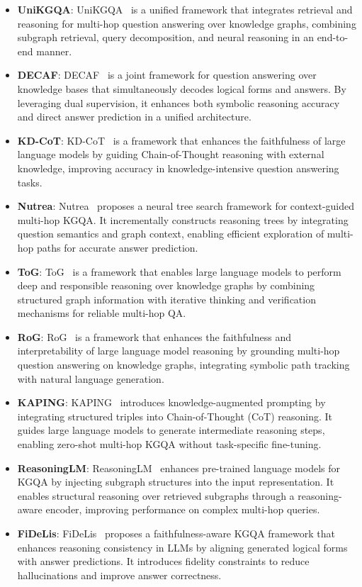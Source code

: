 \begin{itemize}
\begin{itemize}
    \item  \textbf{UniKGQA}: UniKGQA~\cite{jiang2022unikgqa} is a unified framework that integrates retrieval and reasoning for multi-hop question answering over knowledge graphs, combining subgraph retrieval, query decomposition, and neural reasoning in an end-to-end manner.
    \item \textbf{DECAF}: DECAF~\cite{yu2022decaf} is a joint framework for question answering over knowledge bases that simultaneously decodes logical forms and answers. By leveraging dual supervision, it enhances both symbolic reasoning accuracy and direct answer prediction in a unified architecture.
    \item \textbf{KD-CoT}: KD-CoT~\cite{wang2023knowledge} is a framework that enhances the faithfulness of large language models by guiding Chain-of-Thought reasoning with external knowledge, improving accuracy in knowledge-intensive question answering tasks.
    \item \textbf{Nutrea}: Nutrea~\cite{choi2023nutrea} proposes a neural tree search framework for context-guided multi-hop KGQA. It incrementally constructs reasoning trees by integrating question semantics and graph context, enabling efficient exploration of multi-hop paths for accurate answer prediction.
    \item \textbf{ToG}: ToG~\cite{sun2023think} is a framework that enables large language models to perform deep and responsible reasoning over knowledge graphs by combining structured graph information with iterative thinking and verification mechanisms for reliable multi-hop QA.
    \item \textbf{RoG}: RoG~\cite{luo2023reasoning} is a framework that enhances the faithfulness and interpretability of large language model reasoning by grounding multi-hop question answering on knowledge graphs, integrating symbolic path tracking with natural language generation.
    \item \textbf{KAPING}: KAPING~\cite{baek2023knowledge} introduces knowledge-augmented prompting by integrating structured triples into Chain-of-Thought (CoT) reasoning. It guides large language models to generate intermediate reasoning steps, enabling zero-shot multi-hop KGQA without task-specific fine-tuning.
    \item \textbf{ReasoningLM}: ReasoningLM~\cite{jiang2023reasoninglm} enhances pre-trained language models for KGQA by injecting subgraph structures into the input representation. It enables structural reasoning over retrieved subgraphs through a reasoning-aware encoder, improving performance on complex multi-hop queries.
    \item \textbf{FiDeLis}: FiDeLis~\cite{sui2024fidelis} proposes a faithfulness-aware KGQA framework that enhances reasoning consistency in LLMs by aligning generated logical forms with answer predictions. It introduces fidelity constraints to reduce hallucinations and improve answer correctness.
    

\end{itemize}
\end{itemize}
